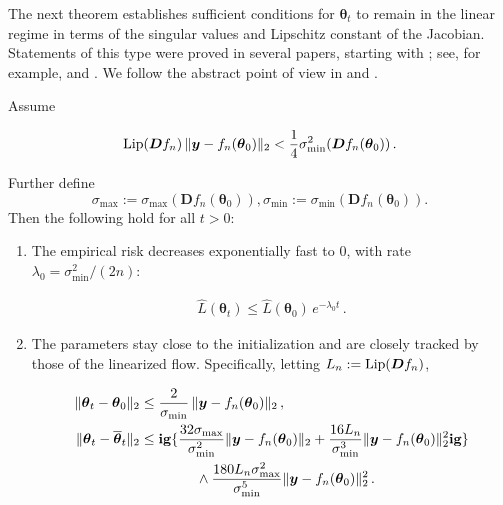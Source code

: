 The next theorem establishes sufficient conditions for ${\boldsymbol \theta}_t$ to remain in the linear regime in terms of the singular values and Lipschitz constant of the Jacobian. Statements of this type were proved in several papers, starting with \cite{du2018gradient}; see, for example,  \cite{allen2019convergence,du2019gradient,zou2020gradient,oymak2020towards} and \cite{liu2020linearity}. We follow the abstract point of view  in \cite{oymak2019overparameterized} and \cite{chizat2019lazy}. 

\begin{theorem}\label{thm:Linearization}
    Assume

  \begin{align}
    {\rm Lip}({\boldsymbol D} f_n)\, \|{\boldsymbol y}-f_n({\boldsymbol \theta}_0)\|_{2} < \frac{1}{4} \sigma^2_{\min}({\boldsymbol D} f_n({\boldsymbol \theta}_0))\, .
    \label{eq:ConditionLinearization}
  \end{align}

  Further define 
  $$\sigma_{\max}:=\sigma_{\max}({\boldsymbol D} f_n({\boldsymbol \theta}_0)), \sigma_{\min}:=\sigma_{\min}({\boldsymbol D}  f_n({\boldsymbol \theta}_0)). $$ Then the following hold for all $t>0$:

  \begin{enumerate}
  \item The empirical risk decreases exponentially fast to $0$, with  rate $\lambda_0 = \sigma^2_{\min}/(2n)$:

    \begin{align}
      \widehat{L}({\boldsymbol \theta}_t)\le \widehat{L}({\boldsymbol \theta}_0) \, e^{-\lambda_0 t}\, .
      \label{eq:R-Linearization}
    \end{align}

  \item The parameters stay close to the initialization and are closely tracked by those of the linearized flow. Specifically, letting $L_n:={\rm Lip}({\boldsymbol D} f_n)$,

  \begin{align}
    \|{\boldsymbol \theta}_t-{\boldsymbol \theta}_0\|_2& \le \frac{2}{\sigma_{\min}}\, \|{\boldsymbol y}-f_n({\boldsymbol \theta}_0)\|_2\, ,\label{eq:CloseToInit}\\
    \|{\boldsymbol \theta} _t-\overline{\boldsymbol \theta}_t\|_2 &\le
      \mathbf{ig}\{\frac{32\sigma_{\max}}{\sigma^2_{\min}}
      \|{\boldsymbol y}-f_n({\boldsymbol \theta}_0)\|_{2}+ \frac{16L_n}{\sigma^3_{\min}}
      \|{\boldsymbol y}-f_n({\boldsymbol \theta}_0)\|^2_{2}\mathbf{ig}\} \notag\\*
    & \qquad\qquad {}
      \wedge
      \frac{180L_n\sigma_{\max}^2}{\sigma^5_{\min}}
      \|{\boldsymbol y}-f_n({\boldsymbol \theta}_0)\|^2_{2}
\,.                                  \label{eq:Coupling}
  \end{align}


\end{enumerate}
\end{theorem}
